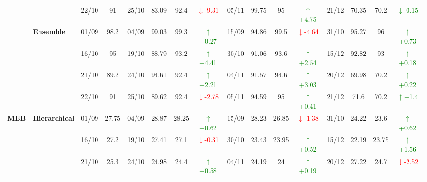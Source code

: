 \documentclass{ieeeaccess}
\begin{document}
{\begin{longtable}{llcc|cccc|cccc|cccc}
&
& 22/10 & 91 & 25/10 & 83.09 & 92.4 & \textcolor{red}{\(\downarrow\)-9.31} & 05/11 & 99.75 & 95 & \textcolor{green}{\(\uparrow\)+4.75} & 21/12 & 70.35 & 70.2 & \textcolor{green}{\(\downarrow\)-0.15} \\
\cmidrule(lr){2-16}


& \textbf{Ensemble}
& 01/09 & 98.2 & 04/09 & 99.03 & 99.3 & \textcolor{green}{\(\uparrow\)+0.27} & 15/09 & 94.86 & 99.5 & \textcolor{red}{\(\downarrow\)-4.64} & 31/10 & 95.27 & 96 & \textcolor{green}{\(\uparrow\)+0.73} \\

&
& 16/10 & 95 & 19/10 & 88.79 & 93.2 & \textcolor{green}{\(\uparrow\)+4.41} & 30/10 & 91.06 & 93.6 & \textcolor{green}{\(\uparrow\)+2.54} & 15/12 & 92.82 & 93 & \textcolor{green}{\(\uparrow\)+0.18} \\

&
& 21/10 & 89.2 & 24/10 & 94.61 & 92.4 & \textcolor{green}{\(\uparrow\)+2.21} & 04/11 & 91.57 & 94.6 & \textcolor{green}{\(\uparrow\)+3.03} & 20/12 & 69.98 & 70.2 & \textcolor{green}{\(\uparrow\)+0.22} \\

&
& 22/10 & 91 & 25/10 & 89.62 & 92.4 & \textcolor{red}{\(\downarrow\)-2.78} & 05/11 & 94.59 & 95 & \textcolor{green}{\(\uparrow\)+0.41} & 21/12 & 71.6 & 70.2 & \textcolor{green}{\(\uparrow\)+1.4} \\
\midrule



\multirow{12}{*}{\textbf{MBB}} 
& \textbf{Hierarchical}
& 01/09 & 27.75 & 04/09 & 28.87 & 28.25 & \textcolor{green}{\(\uparrow\)+0.62} & 15/09 & 28.23 & 26.85 & \textcolor{red}{\(\downarrow\)-1.38} & 31/10 & 24.22 & 23.6 & \textcolor{green}{\(\uparrow\)+0.62} \\

&
& 16/10 & 27.2 & 19/10 & 27.41 & 27.1 & \textcolor{red}{\(\downarrow\)-0.31} & 30/10 & 23.43 & 23.95 & \textcolor{green}{\(\uparrow\)+0.52} & 15/12 & 22.19 & 23.75 & \textcolor{green}{\(\uparrow\)+1.56} \\

&
& 21/10 & 25.3 & 24/10 & 24.98 & 24.4 & \textcolor{green}{\(\uparrow\)+0.58} & 04/11 & 24.19 & 24 & \textcolor{green}{\(\uparrow\)+0.19} & 20/12 & 27.22 & 24.7 & \textcolor{red}{\(\downarrow\)-2.52} \\


\end{longtable}}
\end{document}
